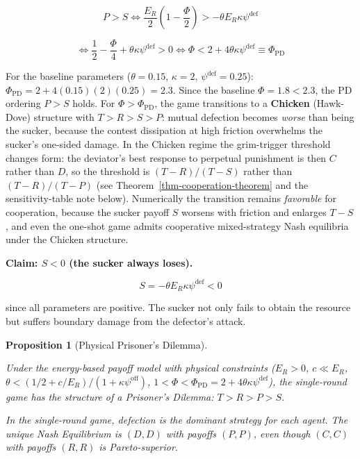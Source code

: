 \documentclass[11pt]{article}
\theoremstyle{plain}
\newtheorem{proposition}[theorem]{Proposition}
\theoremstyle{definition}
\theoremstyle{remark}
\begin{document}
\[P > S \iff \frac{E_R}{2}\left(1 - \frac{\Phi}{2}\right) > -\theta E_R\kappa\psi^{\text{def}}\]

\[\iff \frac{1}{2} - \frac{\Phi}{4} + \theta\kappa\psi^{\text{def}} > 0 \iff \Phi < 2 + 4\theta\kappa\psi^{\text{def}} \equiv \Phi_{\text{PD}}\]

For the baseline parameters (\(\theta = 0.15\), \(\kappa = 2\),
\(\psi^{\text{def}} = 0.25\)):
\(\Phi_{\text{PD}} = 2 + 4(0.15)(2)(0.25) = 2.3\). Since the baseline
\(\Phi = 1.8 < 2.3\), the PD ordering \(P > S\) holds. For
\(\Phi > \Phi_{\text{PD}}\), the game transitions to a \textbf{Chicken}
(Hawk-Dove) structure with \(T > R > S > P\): mutual defection becomes
\emph{worse} than being the sucker, because the contest dissipation at
high friction overwhelms the sucker's one-sided damage. In the Chicken
regime the grim-trigger threshold changes form: the deviator's best
response to perpetual punishment is then \(C\) rather than \(D\), so the
threshold is \((T-R)/(T-S)\) rather than \((T-R)/(T-P)\) (see
Theorem~\ref{thm-cooperation-theorem} and the sensitivity-table note
below). Numerically the transition remains \emph{favorable} for
cooperation, because the sucker payoff \(S\) worsens with friction and
enlarges \(T - S\), and even the one-shot game admits cooperative
mixed-strategy Nash equilibria under the Chicken structure.

\textbf{Claim: \(S < 0\) (the sucker always loses).}

\[S = -\theta E_R \kappa\psi^{\text{def}} < 0\]

since all parameters are positive. The sucker not only fails to obtain
the resource but suffers boundary damage from the defector's attack.

\medskip

\begin{proposition}[Physical Prisoner's Dilemma]
\label{prop-physical-prisoners-dilemma}

Under the energy-based payoff model with physical constraints ($E_R > 0$, $c \ll E_R$, $\theta < (1/2 + c/E_R)/(1 + \kappa\psi^{\text{off}})$, $1 < \Phi < \Phi_{\text{PD}} = 2 + 4\theta\kappa\psi^{\text{def}}$), the single-round game has the structure of a Prisoner's Dilemma: $T > R > P > S$.

In the single-round game, defection is the dominant strategy for each agent. The unique Nash Equilibrium is $(D, D)$ with payoffs $(P, P)$, even though $(C, C)$ with payoffs $(R, R)$ is Pareto-superior.
\end{proposition}
\end{document}
